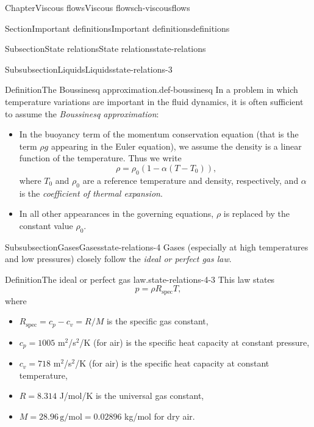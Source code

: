\documentclass[oneside,10pt,]{book}
\newcommand{\ptxlistdisc}{\raisebox{0.3ex}{\textbullet}}
\numberwithin{equation}{section}
\begin{document}
\begin{chapterptx}{Chapter}{Viscous flows}{}{Viscous flows}{}{}{ch-viscousflows}
\begin{sectionptx}{Section}{Important definitions}{}{Important definitions}{}{}{definitions}
\begin{subsectionptx}{Subsection}{State relations}{}{State relations}{}{}{state-relations}
\begin{subsubsectionptx}{Subsubsection}{Liquids}{}{Liquids}{}{}{state-relations-3}
\begin{definition}{Definition}{The Boussinesq approximation.}{}{def-boussinesq}
In a problem in which temperature variations are important in the fluid dynamics, it is often sufficient to assume the \emph{Boussinesq approximation}:%
\begin{itemize}[label=\ptxlistdisc]
\item{}In the buoyancy term of the momentum conservation equation (that is the term \(\rho g\) appearing in the Euler equation), we assume the density is a linear function of the temperature. Thus we write%
\begin{equation*}
\rho = \rho_0(1 - \alpha(T - T_0))\text{,}
\end{equation*}
where \(T_0\) and \(\rho_0\) are a reference temperature and density, respectively, and \(\alpha\) is the \emph{coefficient of thermal expansion}.%
\item{}In all other appearances in the governing equations, \(\rho\) is replaced by the constant value \(\rho_0\).%
\end{itemize}
%
\end{definition}
\end{subsubsectionptx}
%
%
\typeout{************************************************}
\typeout{************************************************}
%
\begin{subsubsectionptx}{Subsubsection}{Gases}{}{Gases}{}{}{state-relations-4}
Gases (especially at high temperatures and low pressures) closely follow the \emph{ideal or perfect gas law}.%
\begin{definition}{Definition}{The ideal or perfect gas law.}{}{state-relations-4-3}%
This law states%
\begin{equation}
p = \rho R_{\textrm{spec}} T,\label{eqn-idealgas}
\end{equation}
where%
\begin{itemize}[label=\ptxlistdisc]
\item{}\(R_{\textrm{spec}} = c_p - c_v = R / M\) is the specific gas constant,%
\item{}\(c_p = 1005\) m\(^2\)\slash{}s\(^2\)\slash{}K (for air) is the specific heat capacity at constant pressure,%
\item{}\(c_v = 718\) m\(^2\)\slash{}s\(^2\)\slash{}K (for air) is the specific heat capacity at constant temperature,%
\item{}\(R = 8.314\) J\slash{}mol\slash{}K is the universal gas constant,%
\item{}\(M = 28.96\,\textrm{g/mol}=0.02896\) kg\slash{}mol for dry air.%
\end{itemize}

\end{definition}
\end{subsubsectionptx}
\end{subsectionptx}
\end{sectionptx}
\end{chapterptx}
\end{document}
